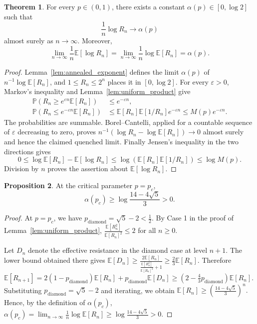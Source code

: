 \documentclass{article}
\theoremstyle{plain}
\theoremstyle{definition}
\newtheorem{theorem}{Theorem}[section]
\newtheorem{proposition}[theorem]{Proposition}
\begin{document}
\endgroup{}











\begin{theorem}\label{thm:reduced_quenched_exponent}
For every $p\in(0,1)$, there exists a constant $\alpha(p)\in[0,\log 2]$ such that
\[
\frac{1}{n}\log R_n\to \alpha(p)
\]
almost surely as $n\to\infty$.
Moreover,
\[
\lim_{n\to\infty}\frac{1}{n}\mathbb E[\log R_n]
=
\lim_{n\to\infty}\frac{1}{n}\log \mathbb E[R_n]
=
\alpha(p).
\]
\end{theorem}

\begingroup\color{red}
\begin{proof}
Lemma~\ref{lem:annealed_exponent} defines the limit $\alpha(p)$ of
$n^{-1}\log\mathbb E[R_n]$, and $1\le R_n\le2^n$ places it in
$[0,\log2]$. For every $\varepsilon>0$, Markov's inequality and
Lemma~\ref{lem:uniform_product} give
\begin{align*}
\mathbb P(R_n\ge e^{\varepsilon n}\mathbb E[R_n])
&\le e^{-\varepsilon n},\\
\mathbb P(R_n\le e^{-\varepsilon n}\mathbb E[R_n])
&\le\mathbb E[R_n]\mathbb E[1/R_n]e^{-\varepsilon n}
\le M(p)e^{-\varepsilon n}.
\end{align*}
The probabilities are summable. Borel--Cantelli, applied for a countable
sequence of $\varepsilon$ decreasing to zero, proves
$n^{-1}(\log R_n-\log\mathbb E[R_n])\to0$ almost surely and hence
the claimed quenched limit. Finally Jensen's inequality in the two
directions gives
\[
0\le\log\mathbb E[R_n]-\mathbb E[\log R_n]
\le\log(\mathbb E[R_n]\mathbb E[1/R_n])\le\log M(p).
\]
Division by $n$ proves the assertion about $\mathbb E[\log R_n]$.
\end{proof}
\endgroup{}


\begin{proposition}\label{prop:alpha_pc_positive}
At the critical parameter \(p=p_c\),
\[
\alpha(p_c)\ge \log\frac{14-4\sqrt5}{3}>0.
\]
\end{proposition}

\begin{proof}
At \(p=p_c\), we have \(p_{\mathrm{diamond}}=\sqrt5-2<\frac{1}{2}\).
By Case 1 in the proof of Lemma~\ref{lem:uniform_product},
$
\frac{\mathbb E[R_n^2]}{\mathbb E[R_n]^2}\le 2
$
for all \(n\ge 0\).

Let \(D_n\) denote the effective resistance in the diamond case at level \(n+1\).
The lower bound obtained there gives
$
\mathbb E[D_n]
\ge
\frac{2\mathbb E[R_n]}{\frac{\mathbb E[R_n^2]}{\mathbb E[R_n]^2}+1}
\ge
\frac{2}{3}\mathbb E[R_n].
$
Therefore
$
\mathbb E[R_{n+1}]
=
2(1-p_{\mathrm{diamond}})\mathbb E[R_n]
+
p_{\mathrm{diamond}}\mathbb E[D_n]
\ge
\left(2-\frac{4}{3}p_{\mathrm{diamond}}\right)\mathbb E[R_n].
$
Substituting \(p_{\mathrm{diamond}}=\sqrt5-2\) and iterating, we obtain
$
\mathbb E[R_n]\ge \left(\frac{14-4\sqrt5}{3}\right)^n.
$
Hence, by the definition of \(\alpha(p_c)\),
$
\displaystyle
\alpha(p_c)
=
\lim_{n\to\infty}\frac{1}{n}\log \mathbb E[R_n]
\ge
\log\frac{14-4\sqrt5}{3}
>
0.
$
\end{proof}
\end{document}
